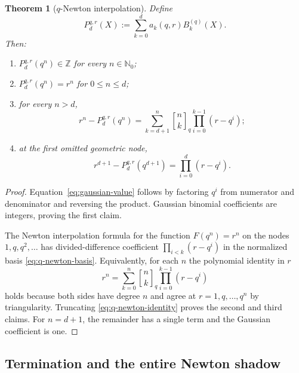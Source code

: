 \documentclass[11pt,oneside]{article}
\newtheorem{theorem}{Theorem}[section]
\theoremstyle{definition}
\theoremstyle{remark}
\newcommand{\Nzero}{\mathbb N_0}
\newcommand{\Z}{\mathbb Z}
\newcommand{\qbinom}[3]{\genfrac{[}{]}{0pt}{}{#1}{#2}_{#3}}
\begin{document}
\begin{theorem}[$q$-Newton interpolation]
\label{thm:q-newton}
Define
\begin{equation}
 P_d^{q,r}(X):=\sum_{k=0}^d a_k(q,r)B_k^{(q)}(X).
 \label{eq:q-newton-poly}
\end{equation}
Then:
\begin{enumerate}
\item $P_d^{q,r}(q^n)\in\Z$ for every $n\in\Nzero$;
\item $P_d^{q,r}(q^n)=r^n$ for $0\le n\le d$;
\item for every $n>d$,
\begin{equation}
 r^n-P_d^{q,r}(q^n)
 =\sum_{k=d+1}^n\qbinom{n}{k}{q}
   \prod_{i=0}^{k-1}(r-q^i);
 \label{eq:q-newton-remainder}
\end{equation}
\item at the first omitted geometric node,
\begin{equation}
 r^{d+1}-P_d^{q,r}(q^{d+1})
 =\prod_{i=0}^d(r-q^i).
 \label{eq:first-extrapolation}
\end{equation}
\end{enumerate}
\end{theorem}

\begin{proof}
Equation~\eqref{eq:gaussian-value} follows by factoring $q^i$ from numerator and denominator
and reversing the product.  Gaussian binomial coefficients are integers, proving the first
claim.

The Newton interpolation formula for the function $F(q^n)=r^n$ on the nodes
$1,q,q^2,\ldots$ has divided-difference coefficient
$\prod_{i<k}(r-q^i)$ in the normalized basis \eqref{eq:q-newton-basis}.  Equivalently, for
each $n$ the polynomial identity in $r$
\begin{equation}
 r^n=\sum_{k=0}^n\qbinom{n}{k}{q}
       \prod_{i=0}^{k-1}(r-q^i)
 \label{eq:q-newton-identity}
\end{equation}
holds because both sides have degree $n$ and agree at $r=1,q,\ldots,q^n$ by triangularity.
Truncating \eqref{eq:q-newton-identity} proves the second and third claims.  For $n=d+1$, the
remainder has a single term and the Gaussian coefficient is one.
\end{proof}

\subsection{Termination and the entire Newton shadow}
\end{document}
